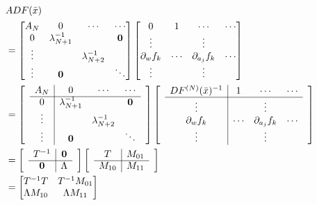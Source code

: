\documentclass[11pt,a4paper,titlepage]{jsreport}
\theoremstyle{definition}
\begin{document}
\begin{equation}
  \begin{split}
    &ADF(\bar{x}) \\
    &= \begin{bmatrix}
      A_N & 0  & \cdots & \cdots  \\
      0 & \lambda_{N+1}^{-1} & & \mathbf{0} \\
      \vdots & & \lambda_{N+2}^{-1} & \\
      \vdots & \mathbf{0} & & \ddots
    \end{bmatrix}
    \begin{bmatrix}
      0 & 1  & \cdots & \cdots \\
      \vdots & & \vdots &\\
      \partial_w f_k & \cdots & \partial_{a_j}f_k & \cdots \\
      \vdots & & \vdots &
   \end{bmatrix}\\
    &= \begin{bmatrix}
      & \multicolumn{1}{c|}{A_N} & 0 & \cdots & \cdots  & \\ \cline{2-5}
      & \multicolumn{1}{c|}{0} & \lambda_{N+1}^{-1} & & \mathbf{0} & \\
      & \multicolumn{1}{c|}{\vdots} & & \lambda_{N+2}^{-1} & & \\
      & \multicolumn{1}{c|}{\vdots} & \mathbf{0} & & \ddots &
    \end{bmatrix}
    \begin{bmatrix}
      & \multicolumn{1}{c|}{DF^{(N)}(\bar{x})^{-1}} & 1  & \cdots & \cdots &\\ \cline{2-5}
      & \multicolumn{1}{c|}{\vdots} & & \vdots & &\\
      & \multicolumn{1}{c|}{\partial_w f_k} & \cdots & \partial_{a_j}f_k & \cdots &\\
      & \multicolumn{1}{c|}{\vdots} & & \vdots & &
    \end{bmatrix}\\
    &= \begin{bmatrix}
      & \multicolumn{1}{c|}{T^{-1}} & \mathbf{0} &  \\ \cline{2-3}
      & \multicolumn{1}{c|}{\mathbf{0}} & \Lambda &
    \end{bmatrix}
    \begin{bmatrix}
      & \multicolumn{1}{c|}{T} & M_{01} &  \\ \cline{2-3}
      & \multicolumn{1}{c|}{M_{10}} & M_{11} &
    \end{bmatrix}\\
    &= \begin{bmatrix}
      T^{-1}T & T^{-1}M_{01} \\
      \Lambda M_{10} & \Lambda M_{11}
    \end{bmatrix}
  \end{split}
  \label{eq:ADF-0}
\end{equation}
\end{document}
